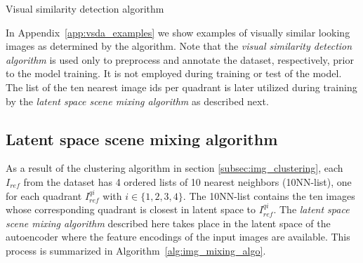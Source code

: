 \documentclass[12pt,a4paper]{article}
\begin{document}
\begin{algorithm}[H]
\DontPrintSemicolon
\LinesNumbered
{}
\caption{Visual similarity detection algorithm}\label{alg:vis_sim_det_algo}
\end{algorithm}

In Appendix~\ref{app:vsda_examples} we show examples of visually similar looking images as determined by the algorithm. Note that the \textit{visual similarity detection algorithm} is used only to preprocess and annotate the dataset, respectively, prior to the model training. It is not employed during training or test of the model. The list of the ten nearest image ids per quadrant is later utilized during training by the \textit{latent space scene mixing algorithm} as described next.


\subsection{Latent space scene mixing algorithm} \label{subsec:img_mixing_algo}
As a result of the clustering algorithm in section \ref{subsec:img_clustering}, each $I_{ref}$ from the dataset has 4 ordered lists of 10 nearest neighbors (10NN-list), one for each quadrant $I^{qi}_{ref}$ with $i \in \{1,2,3,4\}$. The 10NN-list contains the ten images whose corresponding quadrant is closest in latent space to $I^{qi}_{ref}$. The \textit{latent space scene mixing algorithm} described here takes place in the latent space of the autoencoder where the feature encodings of the input images are available. This process is summarized in Algorithm~\ref{alg:img_mixing_algo}. 
\end{document}
